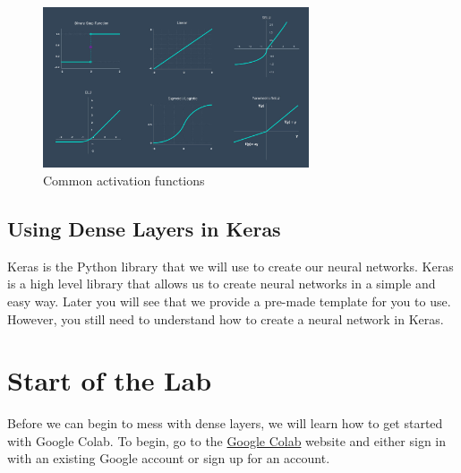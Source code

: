 \documentclass[11pt]{report}
\begin{document}
\begin{figure}
    \begin{center}
    \includegraphics[width=0.7\textwidth]{activation functions 2.jpg}
    \caption{Common activation functions}
    \label{fig:activation_functions}
    \end{center}
\end{figure}

\section{Using Dense Layers in Keras}
Keras is the Python library that we will use to create our neural networks. Keras is a high level library that allows us to create neural networks in a simple and easy way. Later you will see that we provide a pre-made template for you to use. However, you still need to understand how to create a neural network in Keras.

\pagebreak

\chapter{Start of the Lab}
Before we can begin to mess with dense layers, we will learn how to get started with Google Colab. To begin, go to the \href{https://accounts.google.com/v3/signin/identifier?dsh=S1644191332%3A1675546780545376&continue=https%3A%2F%2Fcolab.research.google.com%2F&ec=GAZAqQM&passive=true&flowName=GlifWebSignIn&flowEntry=ServiceLogin&ifkv=AWnogHeZG2rpE0K9cdZU_E4kGDMUnn6If0bNDxEje1kgybK3_oj12LJ91m-WjXqGeI5Ljbego94BOQ}{Google Colab} website and either sign in with an existing Google account or sign up for an account.
\end{document}
